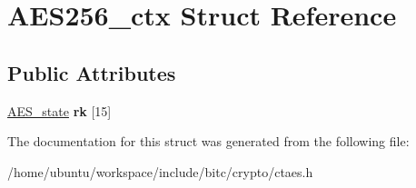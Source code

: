 \hypertarget{structAES256__ctx}{\section{A\-E\-S256\-\_\-ctx Struct Reference}
\label{structAES256__ctx}
}
\subsection*{Public Attributes}
\begin{DoxyCompactItemize}
\item 
\hypertarget{structAES256__ctx_aaaa11f6acdfd8ca0281d22389431e9de}{\hyperlink{structAES__state}{A\-E\-S\-\_\-state} {\bfseries rk} \mbox{[}15\mbox{]}}\label{structAES256__ctx_aaaa11f6acdfd8ca0281d22389431e9de}

\end{DoxyCompactItemize}


The documentation for this struct was generated from the following file\-:\begin{DoxyCompactItemize}
\item 
/home/ubuntu/workspace/include/bitc/crypto/ctaes.\-h\end{DoxyCompactItemize}
